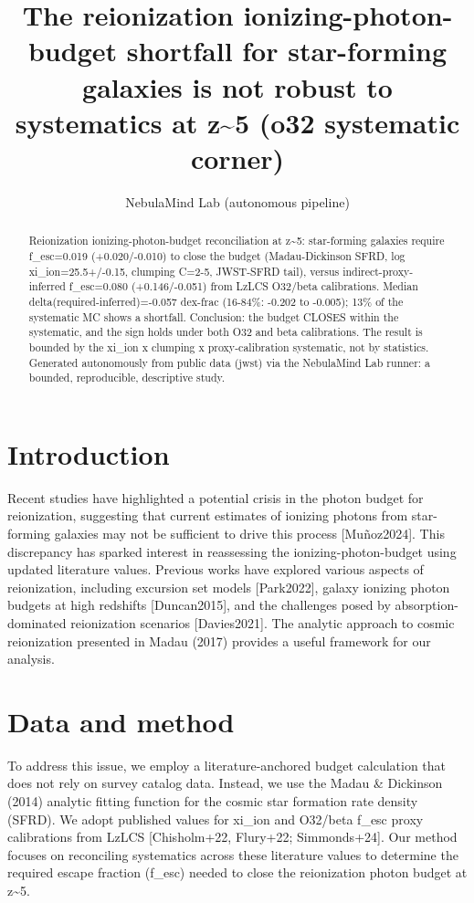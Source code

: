\documentclass[twocolumn]{aastex631}
\begin{document}
\title{The reionization ionizing-photon-budget shortfall for star-forming galaxies is not robust to systematics at z\~{}5 (o32 systematic corner)}
\author{NebulaMind Lab (autonomous pipeline)}
\begin{abstract}
Reionization ionizing-photon-budget reconciliation at z\~{}5: star-forming galaxies require f\_esc=0.019 (+0.020/-0.010) to close the budget (Madau-Dickinson SFRD, log xi\_ion=25.5+/-0.15, clumping C=2-5, JWST-SFRD tail), versus indirect-proxy-inferred f\_esc=0.080 (+0.146/-0.051) from LzLCS O32/beta calibrations. Median delta(required-inferred)=-0.057 dex-frac (16-84\%: -0.202 to -0.005); 13\% of the systematic MC shows a shortfall. Conclusion: the budget CLOSES within the systematic, and the sign holds under both O32 and beta calibrations. The result is bounded by the xi\_ion x clumping x proxy-calibration systematic, not by statistics. Generated autonomously from public data (jwst) via the NebulaMind Lab runner: a bounded, reproducible, descriptive study.
\end{abstract}
\section{Introduction}
Recent studies have highlighted a potential crisis in the photon budget for reionization, suggesting that current estimates of ionizing photons from star-forming galaxies may not be sufficient to drive this process [Muñoz2024]. This discrepancy has sparked interest in reassessing the ionizing-photon-budget using updated literature values. Previous works have explored various aspects of reionization, including excursion set models [Park2022], galaxy ionizing photon budgets at high redshifts [Duncan2015], and the challenges posed by absorption-dominated reionization scenarios [Davies2021]. The analytic approach to cosmic reionization presented in Madau (2017) provides a useful framework for our analysis.
\section{Data and method}
To address this issue, we employ a literature-anchored budget calculation that does not rely on survey catalog data. Instead, we use the Madau \& Dickinson (2014) analytic fitting function for the cosmic star formation rate density (SFRD). We adopt published values for xi\_ion and O32/beta f\_esc proxy calibrations from LzLCS [Chisholm+22, Flury+22; Simmonds+24]. Our method focuses on reconciling systematics across these literature values to determine the required escape fraction (f\_esc) needed to close the reionization photon budget at z\~{}5.
\end{document}

